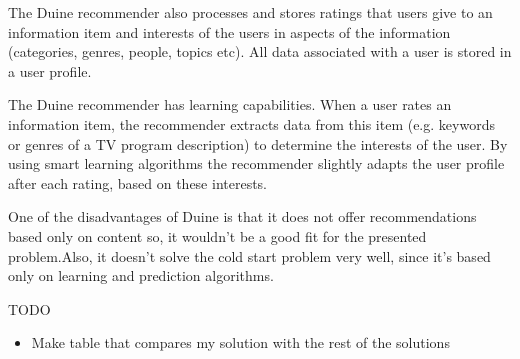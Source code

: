 The Duine recommender also processes and stores ratings that users give to an information item and interests of the users in aspects of the information (categories, genres, people, topics etc). All data associated with a user is stored in a user profile.

The Duine recommender has learning capabilities. When a user rates an information item, the recommender extracts data from this item (e.g. keywords or genres of a TV program description) to determine the interests of the user. By using smart learning algorithms the recommender slightly adapts the user profile after each rating, based on these interests.

One of the disadvantages of Duine is that it does not offer recommendations based only on content so, it wouldn't be a good fit for the presented problem.Also, it doesn't solve the cold start problem very well, since it's based only on learning and prediction algorithms. 

TODO
\begin{itemize}
    \item Make table that compares my solution with the rest of the solutions
\end{itemize}


